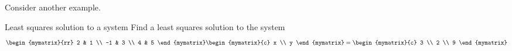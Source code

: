 Consider another example.

\begin{example}{Least squares solution to a system}{}
Find a least squares solution to the system
\begin{equation*}
\begin{mymatrix}{rr}
2 & 1 \\
-1 & 3 \\
4 & 5
\end{mymatrix} \begin{mymatrix}{c}
x \\
y
\end{mymatrix} =\begin{mymatrix}{c}
3 \\
2 \\
9
\end{mymatrix}
\end{equation*}
\end{example}

